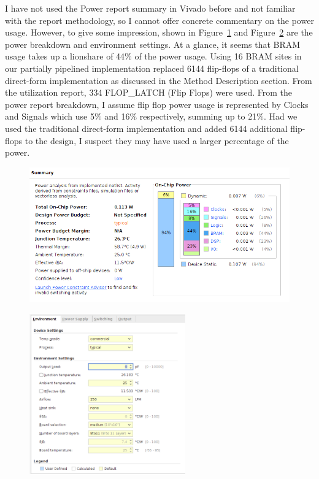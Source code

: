 \documentclass{article}
\begin{document}
    I have not used the Power report summary in Vivado before and not familiar with the report methodology, 
    so I cannot offer concrete commentary on the power usage.
    However, to give some impression, shown in Figure~\ref{fig:power_breakdown} and Figure~\ref{fig:power_environment} 
    are the power breakdown and environment settings.
    At a glance, it seems that BRAM usage takes up a lionshare of 44\% of the power usage.
    Using 16 BRAM sites in our partially pipelined implementation replaced 6144 flip-flops of a 
    traditional direct-form implementation as discussed in the Method Description section.
    From the utilization report, 334 FLOP\_LATCH (Flip Flops) were used.
    From the power report breakdown, I assume flip flop power usage is represented by Clocks and Signals which use 5\% and 16\% respectively, 
    summing up to 21\%.
    Had we used the traditional direct-form implementation and added 6144 additional flip-flops to the design, 
    I suspect they may have used a larger percentage of the power.
    \begin{figure}
        \centering
        \includegraphics[width=1.00\textwidth]{figures/power_breakdown.png}
        \caption{
        }
        \label{fig:power_breakdown}
    \end{figure}
    \begin{figure}
        \centering
        \includegraphics[width=0.60\textwidth]{figures/power_environment.png}
        \caption{
        }
        \label{fig:power_environment}
    \end{figure}
\end{document}
